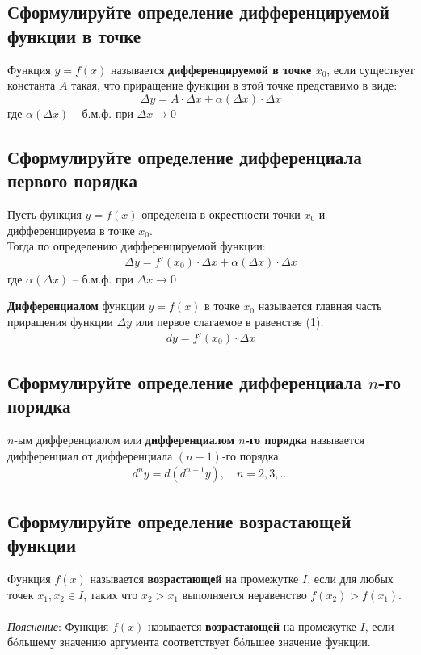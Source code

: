 \subsection{Сформулируйте определение дифференцируемой функции в точке}
\begin{definition}
	Функция $y=f(x)$ называется \textbf{дифференцируемой в точке $x_0$}, если существует константа $A$ такая, что приращение функции в этой точке представимо в виде: \[ \boxed{\Delta y = A\cdot \Delta x + \alpha (\Delta x) \cdot \Delta x} \]
	где $\alpha (\Delta x)$ -- б.м.ф. при $\Delta x \to 0$
\end{definition}
\newpage
\subsection{Сформулируйте определение дифференциала первого порядка}
Пусть функция $y=f(x)$ определена в окрестности точки $x_0$ и дифференцируема в точке $x_0$.\\
Тогда по определению дифференцируемой функции: \begin{align}
	\Delta y = f'(x_0) \cdot \Delta x + \alpha (\Delta x) \cdot \Delta x
\end{align}
где $\alpha (\Delta x)$ -- б.м.ф. при $\Delta x \to 0$
\begin{definition}
	\textbf{Дифференциалом} функции $y=f(x)$ в точке $x_0$ называется главная часть приращения функции $\Delta y$ или первое слагаемое в равенстве (1).
	\begin{align}
		\boxed{dy = f'(x_0) \cdot \Delta x}
	\end{align}
\end{definition}

\subsection{Сформулируйте определение дифференциала $n$-го порядка}
\begin{definition}
	$n$-ым дифференциалом или \textbf{дифференциалом $n$-го порядка} называется дифференциал от дифференциала $(n-1)$-го порядка.
	\begin{gather*}
		d^ny = d(d^{n-1}y), \quad n=2,3,\ldots
	\end{gather*}
\end{definition}

\subsection{Сформулируйте определение возрастающей функции}
\begin{definition}
	Функция $f(x)$ называется \textbf{возрастающей} на промежутке $I$, если для любых точек $x_1, x_2 \in I$, таких что $x_2 > x_1$ выполняется неравенство $f(x_2) > f(x_1)$.\\\\
	\textit{Пояснение}: Функция $f ( x )$ называется \textbf{возрастающей} на промежутке $I$, если бóльшему значению аргумента соответствует бóльшее значение функции.
\end{definition}


